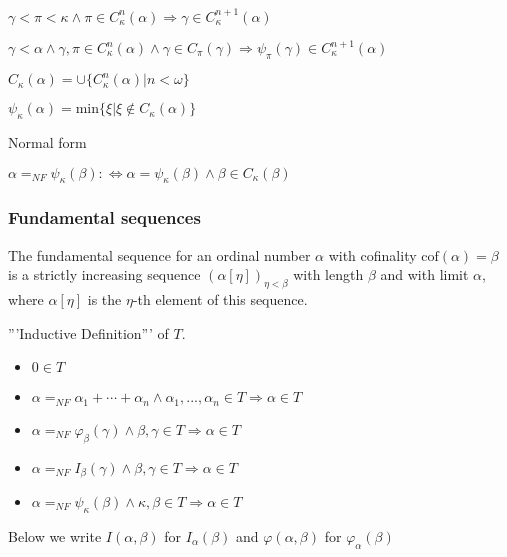 \documentclass[10pt]{article}
\begin{document}
\(\gamma<\pi<\kappa\wedge\pi\in C_\kappa^n(\alpha)\Rightarrow \gamma\in C_\kappa^{n+1}(\alpha)\)

\(\gamma<\alpha\wedge\gamma,\pi\in C_\kappa^n(\alpha)\wedge\gamma\in C_\pi(\gamma)\Rightarrow \psi_\pi(\gamma)\in C_\kappa^{n+1}(\alpha)\)

\(C_\kappa(\alpha)=\cup\{C_\kappa^n(\alpha)|n<\omega\}\)

\(\psi_\kappa(\alpha)=\text{min}\{\xi|\xi\notin C_\kappa(\alpha)\}\)

Normal form

\(\alpha=_{NF}\psi_\kappa(\beta):\Leftrightarrow\alpha=\psi_\kappa(\beta)\wedge\beta\in C_\kappa(\beta)\)


\subsubsection{Fundamental sequences}
 
The fundamental sequence for an ordinal number \(\alpha\) with cofinality \(\text{cof}(\alpha)=\beta\) is a strictly increasing sequence \((\alpha[\eta])_{\eta<\beta}\) with length \(\beta\) and with limit \(\alpha\), where \(\alpha[\eta]\) is the \(\eta\)-th element of this sequence.

'''Inductive Definition''' of \(T\).
\begin{itemize}
     \setlength{\itemsep}{1pt}
     \setlength{\parskip}{0pt}
     \setlength{\parsep}{0pt}
\item \(0 \in T\)
\item \(\alpha=_{NF}\alpha _{1}+\cdots +\alpha _{n}\wedge \alpha _{1},... ,\alpha _{n}\in T\Rightarrow\alpha\in T\)
\item \(\alpha=_{NF}\varphi_\beta(\gamma)\wedge\beta,\gamma\in T\Rightarrow\alpha\in T\)
\item \(\alpha=_{NF}I_\beta(\gamma)\wedge\beta,\gamma\in T\Rightarrow\alpha\in T\)
\item \(\alpha=_{NF}\psi_\kappa(\beta)\wedge\kappa, \beta\in T\Rightarrow\alpha\in T\)
\end{itemize}

Below we write \(I(\alpha,\beta)\) for \(I_\alpha(\beta)\) and \(\varphi(\alpha,\beta)\) for \(\varphi_\alpha(\beta)\)
\end{document}
